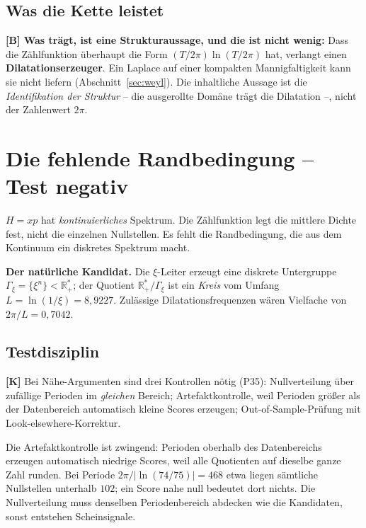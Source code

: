 \subsection{Was die Kette leistet}

\textbf{[B] Was tr\"agt, ist eine Strukturaussage, und die ist nicht
wenig:}
Dass die Z\"ahlfunktion \"uberhaupt die Form
$(T/2\pi)\ln(T/2\pi)$ hat, verlangt einen \textbf{Dilatationserzeuger}.
Ein Laplace auf einer kompakten Mannigfaltigkeit kann sie nicht liefern
(Abschnitt~\ref{sec:weyl}). Die inhaltliche Aussage ist die
\emph{Identifikation der Struktur} -- die ausgerollte Dom\"ane tr\"agt
die Dilatation --, nicht der Zahlenwert $2\pi$.

\section{Die fehlende Randbedingung -- Test negativ}
\label{sec:rand}

$H = xp$ hat \emph{kontinuierliches} Spektrum. Die Z\"ahlfunktion legt
die mittlere Dichte fest, nicht die einzelnen Nullstellen. Es fehlt die
Randbedingung, die aus dem Kontinuum ein diskretes Spektrum macht.

\textbf{Der nat\"urliche Kandidat.} Die $\xi$-Leiter erzeugt eine
diskrete Untergruppe $\Gamma_\xi = \{\xi^n\} < \mathbb{R}_+^*$; der
Quotient $\mathbb{R}_+^*/\Gamma_\xi$ ist ein \emph{Kreis} vom Umfang
$L = \ln(1/\xi) = 8{,}9227$. Zul\"assige Dilatationsfrequenzen w\"aren
Vielfache von $2\pi/L = 0{,}7042$.

\subsection{Testdisziplin}

\textbf{[K]} Bei N\"ahe-Argumenten sind drei Kontrollen n\"otig (P35):
Nullverteilung \"uber zuf\"allige Perioden im \emph{gleichen} Bereich;
Artefaktkontrolle, weil Perioden gr\"o\ss er als der Datenbereich
automatisch kleine Scores erzeugen; Out-of-Sample-Pr\"ufung mit
Look-elsewhere-Korrektur.

Die Artefaktkontrolle ist zwingend: Perioden oberhalb des
Datenbereichs erzeugen automatisch niedrige Scores, weil alle
Quotienten auf dieselbe ganze Zahl runden. Bei Periode
$2\pi/|\ln(74/75)| = 468$ etwa liegen s\"amtliche Nullstellen
unterhalb $102$; ein Score nahe null bedeutet dort nichts. Die
Nullverteilung muss denselben Periodenbereich abdecken wie die
Kandidaten, sonst entstehen Scheinsignale.

